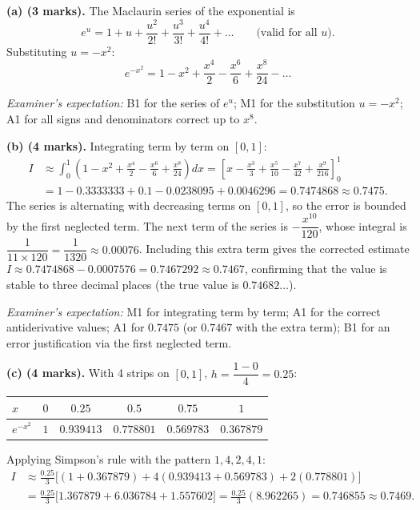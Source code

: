 \documentclass[11pt]{article}
\begin{document}
\begin{corrige}
\textbf{(a) (3 marks).} The Maclaurin series of the exponential is
\[ e^u = 1 + u + \frac{u^2}{2!} + \frac{u^3}{3!} + \frac{u^4}{4!} + \dots \qquad \text{(valid for all } u\text{)}. \]
Substituting $u = -x^2$:
\[ e^{-x^2} = 1 - x^2 + \frac{x^4}{2} - \frac{x^6}{6} + \frac{x^8}{24} - \dots \]

\emph{Examiner's expectation:} B1 for the series of $e^u$; M1 for the substitution $u = -x^2$; A1 for all signs and denominators correct up to $x^8$.

\textbf{(b) (4 marks).} Integrating term by term on $[0,1]$:
\begin{align*}
I &\approx \int_0^1 \left(1 - x^2 + \frac{x^4}{2} - \frac{x^6}{6} + \frac{x^8}{24}\right) dx = \left[x - \frac{x^3}{3} + \frac{x^5}{10} - \frac{x^7}{42} + \frac{x^9}{216}\right]_0^1 \\
&= 1 - 0.3333333 + 0.1 - 0.0238095 + 0.0046296 = 0.7474868 \approx 0.7475.
\end{align*}
The series is alternating with decreasing terms on $[0,1]$, so the error is bounded by the first neglected term. The next term of the series is $-\dfrac{x^{10}}{120}$, whose integral is $\dfrac{1}{11 \times 120} = \dfrac{1}{1320} \approx 0.00076$. Including this extra term gives the corrected estimate $I \approx 0.7474868 - 0.0007576 = 0.7467292 \approx 0.7467$, confirming that the value is stable to three decimal places (the true value is $0.74682\dots$).

\emph{Examiner's expectation:} M1 for integrating term by term; A1 for the correct antiderivative values; A1 for $0.7475$ (or $0.7467$ with the extra term); B1 for an error justification via the first neglected term.

\textbf{(c) (4 marks).} With 4 strips on $[0,1]$, $h = \dfrac{1-0}{4} = 0.25$:

\begin{center}
\begin{tabular}{|l|c|c|c|c|c|}
\hline
\rowcolor{popblueL} $x$ & $0$ & $0.25$ & $0.5$ & $0.75$ & $1$ \\
\hline
$e^{-x^2}$ & $1$ & $0.939413$ & $0.778801$ & $0.569783$ & $0.367879$ \\
\hline
\end{tabular}
\end{center}

Applying Simpson's rule with the pattern $1, 4, 2, 4, 1$:
\begin{align*}
I &\approx \frac{0.25}{3}\Big[(1 + 0.367879) + 4(0.939413 + 0.569783) + 2(0.778801)\Big] \\
&= \frac{0.25}{3}\big[1.367879 + 6.036784 + 1.557602\big] = \frac{0.25}{3}(8.962265) = 0.746855 \approx 0.7469.
\end{align*}


\end{corrige}
\end{document}
